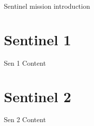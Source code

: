 Sentinel mission introduction

\section{Sentinel 1}

Sen 1 Content

\section{Sentinel 2}

Sen 2 Content